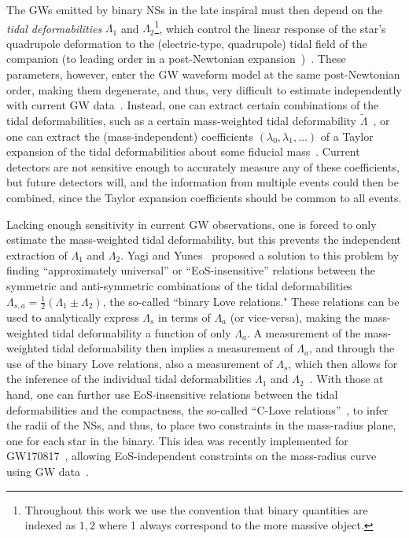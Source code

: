 \documentclass[prd,twocolumn,nofootinbib,superscriptaddress,amsmath,amssymb]{revtex4-1}
\begin{document}
The GWs emitted by binary NSs in the late inspiral must then depend on the \emph{tidal deformabilities} $\Lambda_1$ and $\Lambda_2$\footnote{Throughout this work we use the convention that binary quantities are indexed as $1,2$ where 1 always correspond to the more massive object.}, which control the linear response of the star's quadrupole deformation to the (electric-type, quadrupole) tidal field of the companion (to leading order in a post-Newtonian expansion~\cite{Blanchet:2013haa})~\cite{Flanagan2008,Vines:2011ud}. These parameters, however, enter the GW waveform model at the same post-Newtonian order, making them degenerate, and thus, very difficult to estimate independently with current GW data~\cite{Wade:tidalCorrections}. Instead, one can extract certain combinations of the tidal deformabilities, such as a certain mass-weighted tidal deformability $\tilde{\Lambda}$~\cite{Favata:2013rwa,Wade:tidalCorrections}, or one can extract the (mass-independent) coefficients $(\lambda_{0},\lambda_{1},\ldots)$ of a Taylor expansion of the tidal deformabilities about some fiducial mass~\cite{Messenger:2011gi,delPozzo:TaylorTidal,Yagi:binLove}. Current detectors are not sensitive enough to accurately measure any of these coefficients, but future detectors will, and the information from multiple events could then be combined, since the Taylor expansion coefficients should be common to all events. 

Lacking enough sensitivity in current GW observations, one is forced to only estimate the mass-weighted tidal deformability, but this prevents the independent extraction of $\Lambda_{1}$ and $\Lambda_{2}$. Yagi and Yunes~\cite{Yagi:2015pkc,Yagi:binLove} proposed a solution to this problem by finding ``approximately universal'' or ``EoS-insensitive'' relations between the symmetric and anti-symmetric combinations of the tidal deformabilities $\Lambda_{s,a}=\frac{1}{2}(\Lambda_1 \pm \Lambda_2)$, the so-called ``binary Love relations." These relations can be used to analytically express $\Lambda_{s}$ in terms of $\Lambda_{a}$ (or vice-versa), making the mass-weighted tidal deformability a function of only $\Lambda_{a}$. A measurement of the mass-weighted tidal deformability then implies a measurement of $\Lambda_{a}$, and through the use of the binary Love relations, also a measurement of $\Lambda_{s}$, which then allows for the inference of the individual tidal deformabilities $\Lambda_{1}$ and $\Lambda_{2}$~\cite{Yagi:2015pkc,Yagi:binLove}. With those at hand, one can further use EoS-insensitive relations between the tidal deformabilities and the compactness, the so-called ``C-Love relations''~\cite{Yagi:2013bca,Yagi:ILQ,Maselli:2013mva,Yagi:2016bkt}, to infer the radii of the NSs, and thus, to place two constraints in the mass-radius plane, one for each star in the binary. This idea was recently implemented for GW170817~\cite{TheLIGOScientific:2017qsa}, allowing EoS-independent constraints on the mass-radius curve using GW data~\cite{Katerina:residuals,LIGO:posterior}.     
\end{document}
